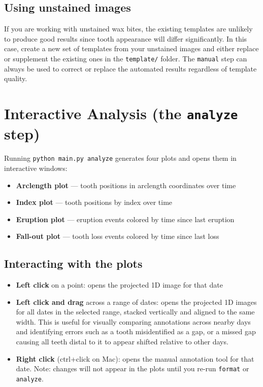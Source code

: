 \documentclass[11pt, letterpaper]{article}
\begin{document}
\subsection*{Using unstained images}

If you are working with unstained wax bites, the existing templates are unlikely to
produce good results since tooth appearance will differ significantly. In this case,
create a new set of templates from your unstained images and either replace or
supplement the existing ones in the \texttt{template/} folder. The \texttt{manual}
step can always be used to correct or replace the automated results regardless of
template quality.

\section{Interactive Analysis (the \texttt{analyze} step)}

Running \texttt{python main.py analyze} generates four plots and opens them in
interactive windows:

\begin{itemize}[leftmargin=*]
  \item \textbf{Arclength plot} --- tooth positions in arclength coordinates over time
  \item \textbf{Index plot} --- tooth positions by index over time
  \item \textbf{Eruption plot} --- eruption events colored by time since last eruption
  \item \textbf{Fall-out plot} --- tooth loss events colored by time since last loss
\end{itemize}

\subsection*{Interacting with the plots}

\begin{itemize}[leftmargin=*]
  \item \textbf{Left click} on a point: opens the projected 1D image for that date
  \item \textbf{Left click and drag} across a range of dates: opens the projected 1D
        images for all dates in the selected range, stacked vertically and aligned to
        the same width. This is useful for visually comparing annotations across nearby
        days and identifying errors such as a tooth misidentified as a gap, or a missed
        gap causing all teeth distal to it to appear shifted relative to other days.
  \item \textbf{Right click} (ctrl+click on Mac): opens the manual annotation tool for
        that date. Note: changes will not appear in the plots until you re-run
        \texttt{format} or \texttt{analyze}.
\end{itemize}
\end{document}
